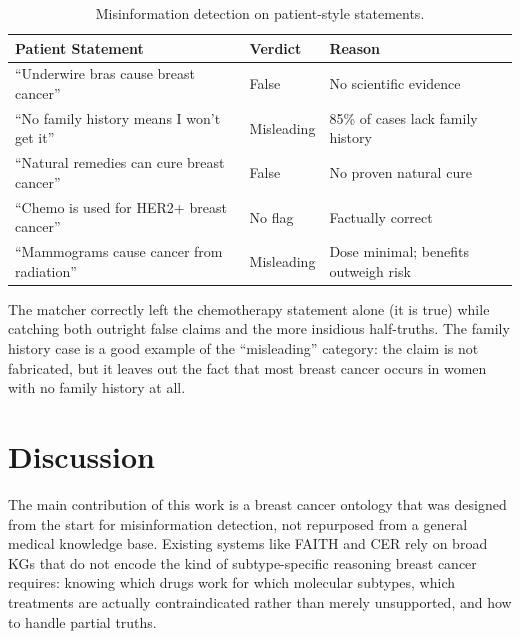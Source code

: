 \documentclass[10pt,a4paper]{article}
\begin{document}
\begin{table}[H]
    \centering
    \caption{Misinformation detection on patient-style statements.}
    \label{tab:misinfo}
    \vspace{2pt}
    \begin{tabular}{@{}p{5.5cm}lp{3.8cm}@{}}
        \toprule
        \textbf{Patient Statement} & \textbf{Verdict} & \textbf{Reason} \\
        \midrule
        ``Underwire bras cause breast cancer''
            & False     & No scientific evidence \\[3pt]
        ``No family history means I won't get it''
            & Misleading & 85\% of cases lack family history \\[3pt]
        ``Natural remedies can cure breast cancer''
            & False     & No proven natural cure \\[3pt]
        ``Chemo is used for HER2+ breast cancer''
            & No flag   & Factually correct \\[3pt]
        ``Mammograms cause cancer from radiation''
            & Misleading & Dose minimal; benefits outweigh risk \\
        \bottomrule
    \end{tabular}
\end{table}

The matcher correctly left the chemotherapy statement alone (it is true) while catching both outright false claims and the more insidious half-truths. The family history case is a good example of the ``misleading'' category: the claim is not fabricated, but it leaves out the fact that most breast cancer occurs in women with no family history at all.

\section{Discussion}
\label{sec:discussion}

The main contribution of this work is a breast cancer ontology that was designed from the start for misinformation detection, not repurposed from a general medical knowledge base. Existing systems like FAITH and CER rely on broad KGs that do not encode the kind of subtype-specific reasoning breast cancer requires: knowing which drugs work for which molecular subtypes, which treatments are actually contraindicated rather than merely unsupported, and how to handle partial truths.
\end{document}
